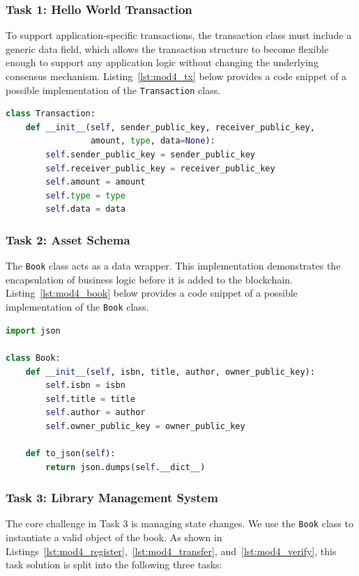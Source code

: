 \subsubsection*{Task 1: Hello World Transaction}
To support application-specific transactions, the transaction class must include a generic data field, which allows the transaction structure to become flexible enough to support any application logic without changing the underlying consensus mechanism. Listing~\ref{lst:mod4_tx} below provides a code snippet of a possible implementation of the \texttt{Transaction} class.

\begin{lstlisting}[language=Python, caption=Transaction Class code snippet, label=lst:mod4_tx]
class Transaction:
    def __init__(self, sender_public_key, receiver_public_key,
                 amount, type, data=None):
        self.sender_public_key = sender_public_key
        self.receiver_public_key = receiver_public_key
        self.amount = amount
        self.type = type
        self.data = data
\end{lstlisting}

\subsubsection*{Task 2: Asset Schema}
The \texttt{Book} class acts as a data wrapper. This implementation demonstrates the encapsulation of business logic before it is added to the blockchain.  Listing~\ref{lst:mod4_book} below provides a code snippet of a possible implementation of the \texttt{Book} class.

\begin{lstlisting}[language=Python, caption=The Digital Book Asset Class, label=lst:mod4_book]
import json

class Book:
    def __init__(self, isbn, title, author, owner_public_key):
        self.isbn = isbn
        self.title = title
        self.author = author
        self.owner_public_key = owner_public_key

    def to_json(self):
        return json.dumps(self.__dict__)
\end{lstlisting}

\subsubsection*{Task 3: Library Management System}

The core challenge in Task 3 is managing state changes. We use the \texttt{Book} class to instantiate a valid object of the book. As shown in Listings~\ref{lst:mod4_register},~\ref{lst:mod4_transfer}, and~\ref{lst:mod4_verify}, this task solution is split into the following three tasks:\\

